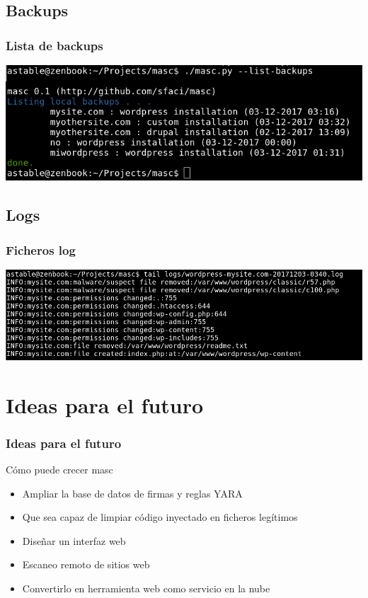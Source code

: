 \documentclass[xcolor={dvipsnames}]{beamer}
\begin{document}
\subsection{Backups}
\begin{frame}\frametitle{Lista de backups}
    \includegraphics[scale=0.4]{list-backups} 
\end{frame}

\subsection{Logs}
\begin{frame}\frametitle{Ficheros log}
    \includegraphics[scale=0.3]{log} 
\end{frame}

\section{Ideas para el futuro}
\begin{frame}\frametitle{Ideas para el futuro}
    \begin{block}{Cómo puede crecer masc}
    \begin{itemize}
        \item Ampliar la base de datos de firmas y reglas YARA
        \item Que sea capaz de limpiar código inyectado en ficheros legítimos
        \item Diseñar un interfaz web
        \item Escaneo remoto de sitios web
        \item Convertirlo en herramienta web como servicio en la nube
    \end{itemize}
    \end{block}
\end{frame}
\end{document}
